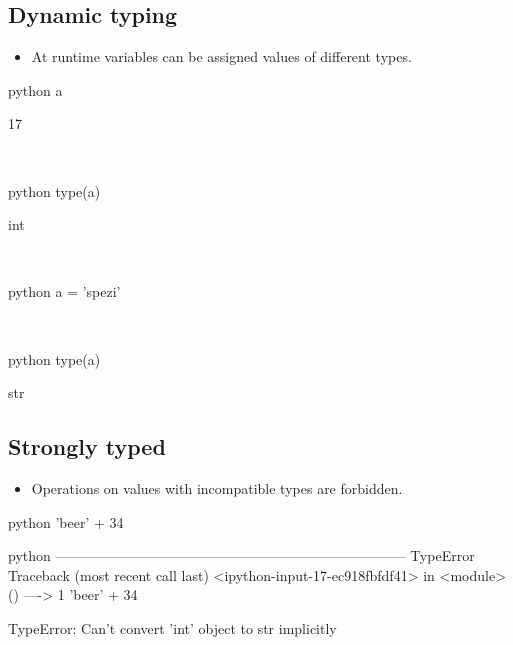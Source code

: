 \documentclass[aspectratio=1610,slidestop]{beamer}
\begin{document}
\subsection{Dynamic typing}
\begin{pframe}
 \begin{itemize}
  \item At runtime variables can be assigned values of different types.
 \end{itemize}

 \begin{ipython}
  \begin{pythonin}{python}
a
  \end{pythonin}
  \begin{pythonout}
17
  \end{pythonout}
  \\

  \begin{pythonin}{python}
type(a)
  \end{pythonin}
  \begin{pythonout}
int
  \end{pythonout}
  \\

  \begin{pythonin}{python}
a = 'spezi'
  \end{pythonin}
  \\
  \begin{pythonin}{python}
type(a)
  \end{pythonin}
  \begin{pythonout}
str
  \end{pythonout}
 \end{ipython}
\end{pframe}


\subsection{Strongly typed}
\begin{pframe}
 \begin{itemize}
  \item Operations on values with incompatible types are forbidden.
 \end{itemize}

 \begin{ipython}
  \begin{pythonin}{python}
'beer' + 34
  \end{pythonin}
  \begin{pythonerr}{python}
---------------------------------------------------------------------------
TypeError                                 Traceback (most recent call last)
<ipython-input-17-ec918fbfdf41> in <module>()
----> 1 'beer' + 34

TypeError: Can't convert 'int' object to str implicitly
  \end{pythonerr}
 \end{ipython}
\end{pframe}
\end{document}
